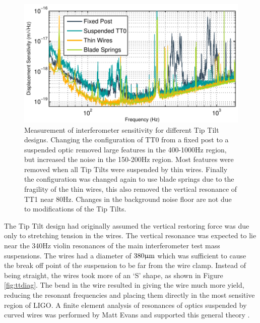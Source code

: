 \begin{figure}
  \begin{center}
  \leavevmode
  \includegraphics{figs-jitter/sensimprovement.pdf}
  \end{center}
  \caption[Measurement of interferometer sensitivity for different Tip Tilt designs.]{Measurement of interferometer sensitivity for different Tip Tilt designs. Changing the configuration of TT0 from a fixed post to a suspended optic removed large features in the 400-1000Hz region, but increased the noise in the 150-200Hz region. Most features were removed when all Tip Tilts were suspended by thin wires. Finally the configuration was changed again to use blade springs due to the fragility of the thin wires, this also removed the vertical resonance of TT1 near 80Hz. Changes in the background noise floor are not due to modifications of the Tip Tilts.}
  \label{fig:sensimprovement}
\end{figure}

The Tip Tilt design had originally assumed the vertical restoring force was due only to stretching tension in the wires. %
The vertical resonance was expected to lie near the 340Hz violin resonances of the main interferometer test mass suspensions. %
The wires had a diameter of $380\upmu \rm m$ which was sufficient to cause the break off point of the suspension to be far from the wire clamp. %
Instead of being straight, the wires took more of an `S' shape, as shown in Figure \ref{fig:ttdiag}. %
The bend in the wire resulted in giving the wire much more yield, reducing the resonant frequencies and placing them directly in the most sensitive region of LIGO. %
A finite element analysis of resonances of optics suspended by curved wires was performed by Matt Evans and supported this general theory \cite{mattfea}.

